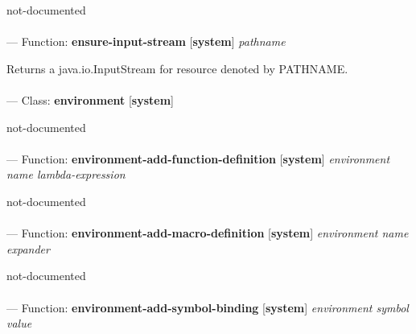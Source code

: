 \begin{adjustwidth}{5em}{5em}
not-documented
\end{adjustwidth}

\paragraph{}
\label{SYSTEM:ENSURE-INPUT-STREAM}
--- Function: \textbf{ensure-input-stream} [\textbf{system}] \textit{pathname}

\begin{adjustwidth}{5em}{5em}
Returns a java.io.InputStream for resource denoted by PATHNAME.
\end{adjustwidth}

\paragraph{}
\label{SYSTEM:ENVIRONMENT}
--- Class: \textbf{environment} [\textbf{system}] \textit{}

\begin{adjustwidth}{5em}{5em}
not-documented
\end{adjustwidth}

\paragraph{}
\label{SYSTEM:ENVIRONMENT-ADD-FUNCTION-DEFINITION}
--- Function: \textbf{environment-add-function-definition} [\textbf{system}] \textit{environment name lambda-expression}

\begin{adjustwidth}{5em}{5em}
not-documented
\end{adjustwidth}

\paragraph{}
\label{SYSTEM:ENVIRONMENT-ADD-MACRO-DEFINITION}
--- Function: \textbf{environment-add-macro-definition} [\textbf{system}] \textit{environment name expander}

\begin{adjustwidth}{5em}{5em}
not-documented
\end{adjustwidth}

\paragraph{}
\label{SYSTEM:ENVIRONMENT-ADD-SYMBOL-BINDING}
--- Function: \textbf{environment-add-symbol-binding} [\textbf{system}] \textit{environment symbol value}


